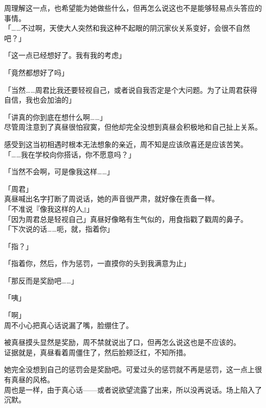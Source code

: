 周理解这一点，也希望能为她做些什么，但再怎么说这也不是能够轻易点头答应的事情。\\

「……不过啊，天使大人突然和我这种不起眼的阴沉家伙关系变好，会很不自然吧？」

「这一点已经想好了。我有我的考虑」

「竟然都想好了吗」

「当然……周君比我还要轻视自己，或者说自我否定是个大问题。为了让周君获得自信，我也会加油的」

「讲真的你到底在想什么啊……」\\

尽管周注意到了真昼很怕寂寞，但他却完全没想到真昼会积极地和自己扯上关系。

感受到这当初相遇时根本无法想象的亲近，周不知是应该欣喜还是应该苦笑。\\

「……我在学校向你搭话，你不愿意吗？」

「当然不会啊，可是像我这样……」

「周君」\\

真昼喊出名字打断了周说话，她的声音很严肃，就好像在责备一样。\\

「不准说『像我这样的人』」\\

「因为周君总是轻视自己」真昼好像略有生气似的，用食指戳了戳周的鼻子。\\

「下次说的话……呃，就，指着你」

「指？」

「指着你，然后，作为惩罚，一直摸你的头到我满意为止」

「那反而是奖励吧……」

「咦」

「啊」\\

周不小心把真心话说漏了嘴，脸绷住了。

被真昼摸头显然是奖励，周不禁就说出了口，但再怎么说这也是不应该的。\\

证据就是，真昼看着周僵住了，然后脸颊泛红，不知所措。

她完全没想到自己的惩罚会是奖励吧。可爱过头的惩罚就不再是惩罚，这一点上很有真昼的风格。\\

周也是一样，由于真心话——或者说欲望流露了出来，所以没再说话。场上陷入了沉默。\\


